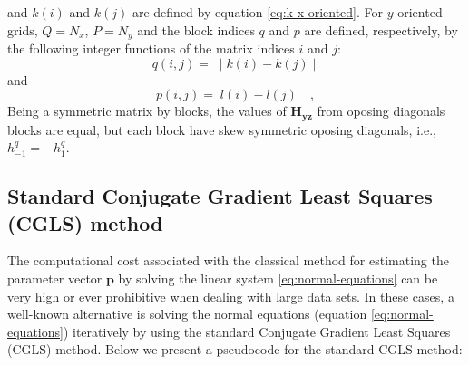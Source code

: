 and $k(i)$ and $k(j)$ are defined by equation \ref{eq:k-x-oriented}.
For $y$-oriented grids, $Q = N_{x}$, $P = N_{y}$ and the block indices
$q$ and $p$ are defined, respectively, by the following integer functions 
of the matrix indices $i$ and $j$:
\begin{equation}
q(i, j) = \; \mid k(i) - k(j) \mid
\label{eq:Hyz-q-y-oriented}
\end{equation}
and
\begin{equation}
p(i, j) = \; l(i) - l(j) \quad ,
\label{eq:Hyz-p-y-oriented}
\end{equation}
Being a symmetric matrix by blocks, the values of $\mathbf{H_{yz}}$ from oposing diagonals blocks are equal, but each block have skew symmetric oposing diagonals, i.e., $h^{q}_{-1} = - h^{q}_{1}$.


\subsection{Standard Conjugate Gradient Least Squares (CGLS) method}

The computational cost associated with the classical method for estimating the parameter 
vector $\mathbf{p}$ by solving the linear system \ref{eq:normal-equations} can be very high 
or ever prohibitive when dealing with large data sets. In these cases, a well-known alternative
is solving the normal equations (equation \ref{eq:normal-equations}) iteratively by 
using the standard Conjugate Gradient Least Squares (CGLS) method. Below we present a pseudocode 
for the standard CGLS method:

